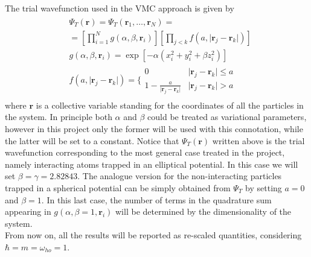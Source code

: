 The trial wavefunction used in the VMC approach is given by
\begin{align}
\begin{split}
    &\Psi_T(\bm{r}) = \Psi_T(\bm{r}_1, \dots, \bm{r}_N) = \\
    &= \left[ \prod_{i=1}^N g(\alpha, \beta, \bm{r}_i) \right] \left[ \prod_{j<k} f(a, \vert \bm{r}_j - \bm{r}_k \vert ) \right] \\
    &g(\alpha, \beta, \bm{r}_i) = \exp \left[ -\alpha \left( x_i^2 + y_i^2 + \beta z_i^2 \right) \right] \\
    &f(a, \vert \bm{r}_j - \bm{r}_k \vert ) = \Bigg\{ \begin{array}{ll}
        0 & \vert \bm{r}_j - \bm{r}_k \vert \leq a \\
        1 - \frac{a}{\vert \bm{r}_j - \bm{r}_k \vert} & \vert \bm{r}_j - \bm{r}_k \vert > a
    \end{array}
\end{split}
\label{wavefunctions}
\end{align}
where $\bm{r}$ is a collective variable standing for the coordinates of all the particles in the system. In principle both $\alpha$ and $\beta$ could be treated as variational parameters, however in this project only the former will be used with this connotation, while the latter will be set to a constant. Notice that $\Psi_T(\bm{r})$ written above is the trial wavefunction corresponding to the most general case treated in the project, namely interacting atoms trapped in an elliptical potential. In this case we will set $\beta = \gamma = 2.82843$. The analogue version for the non-interacting particles trapped in a spherical potential can be simply obtained from $\Psi_T$ by setting $a=0$ and $\beta=1$. In this last case, the number of terms in the quadrature sum appearing in $g(\alpha, \beta=1, \bm{r}_i)$ will be determined by the dimensionality of the system. \\

From now on, all the results will be reported as re-scaled quantities, considering $\hbar = m = \omega_{ho} = 1$.
